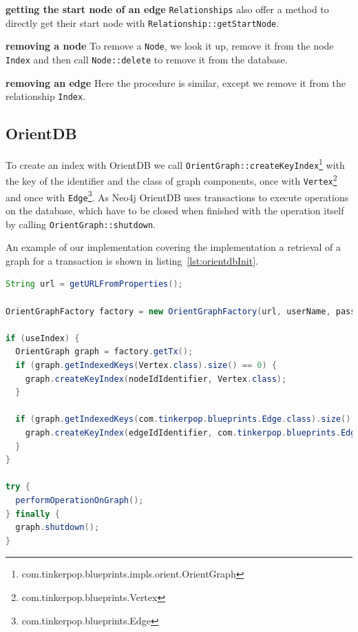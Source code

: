 \textbf{getting the start node of an edge} \newline
\texttt{Relationships} also offer a method to directly get their start node with \texttt{Relationship::getStartNode}.

\textbf{removing a node} \newline
To remove a \texttt{Node},
we look it up,
remove it from the node \texttt{Index} and then call \texttt{Node::delete} to remove it from the database.

\textbf{removing an edge} \newline
Here the procedure is similar,
except we remove it from the relationship \texttt{Index}.

\subsection{OrientDB}
To create an index with OrientDB we call \texttt{OrientGraph::createKeyIndex}\footnote{com.tinkerpop.blueprints.impls.orient.OrientGraph} with the key of the identifier and the class of graph components,
once with \texttt{Vertex}\footnote{com.tinkerpop.blueprints.Vertex} and once with \texttt{Edge}\footnote{com.tinkerpop.blueprints.Edge}.
As Neo4j OrientDB uses transactions to execute operations on the database,
which have to be closed when finished with the operation itself by calling \texttt{OrientGraph::shutdown}.

An example of our implementation covering the implementation a retrieval of a graph for a transaction is shown in listing~\ref{lst:orientdbInit}.

\begin{lstlisting}[language=Java,label={lst:orientdbInit},caption={Implementation of the initialisation and the retrieval of a graph for a transaction.}]
String url = getURLFromProperties();

OrientGraphFactory factory = new OrientGraphFactory(url, userName, password);

if (useIndex) {
  OrientGraph graph = factory.getTx();
  if (graph.getIndexedKeys(Vertex.class).size() == 0) {
    graph.createKeyIndex(nodeIdIdentifier, Vertex.class);
  }

  if (graph.getIndexedKeys(com.tinkerpop.blueprints.Edge.class).size() == 0) {
    graph.createKeyIndex(edgeIdIdentifier, com.tinkerpop.blueprints.Edge.class);
  }
}

try {
  performOperationOnGraph();
} finally {
  graph.shutdown();
}
\end{lstlisting}

